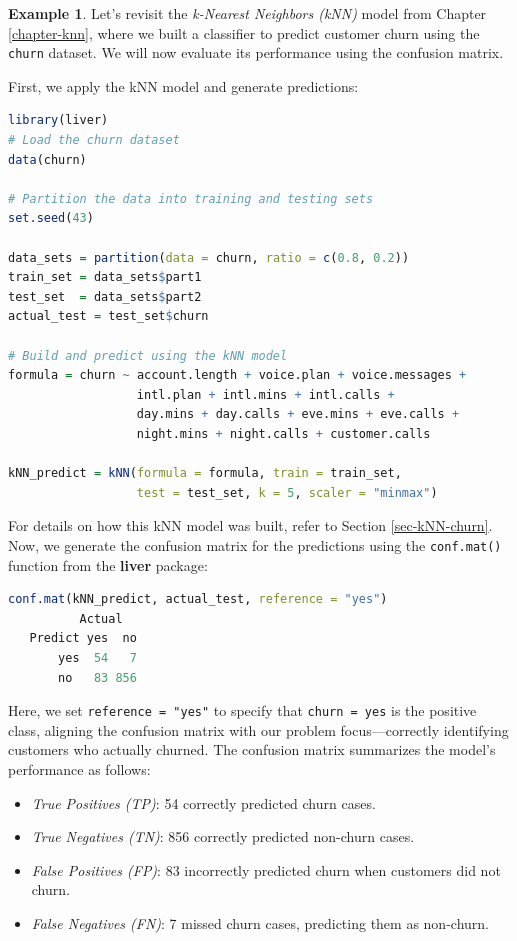 \documentclass[
  11pt,
]{book}
\newcommand{\passthrough}[1]{#1}
\providecommand{\tightlist}{%
  \setlength{\itemsep}{0pt}\setlength{\parskip}{0pt}}
\theoremstyle{definition}
\theoremstyle{definition}
\newtheorem{example}{Example}[chapter]
\theoremstyle{definition}
\theoremstyle{definition}
\theoremstyle{remark}
\begin{document}
\begin{example}
\protect\hypertarget{exm:ex-confusion-matrix-kNN}{}\label{exm:ex-confusion-matrix-kNN}Let's revisit the \emph{k-Nearest Neighbors (kNN)} model from Chapter \ref{chapter-knn}, where we built a classifier to predict customer churn using the \passthrough{\lstinline!churn!} dataset. We will now evaluate its performance using the confusion matrix.

First, we apply the kNN model and generate predictions:

\begin{lstlisting}[language=R]
library(liver)  
# Load the churn dataset
data(churn)

# Partition the data into training and testing sets
set.seed(43)

data_sets = partition(data = churn, ratio = c(0.8, 0.2))
train_set = data_sets$part1
test_set  = data_sets$part2
actual_test = test_set$churn

# Build and predict using the kNN model
formula = churn ~ account.length + voice.plan + voice.messages + 
                  intl.plan + intl.mins + intl.calls + 
                  day.mins + day.calls + eve.mins + eve.calls + 
                  night.mins + night.calls + customer.calls

kNN_predict = kNN(formula = formula, train = train_set, 
                  test = test_set, k = 5, scaler = "minmax")
\end{lstlisting}

For details on how this kNN model was built, refer to Section \ref{sec-kNN-churn}. Now, we generate the confusion matrix for the predictions using the \passthrough{\lstinline!conf.mat()!} function from the \textbf{liver} package:

\begin{lstlisting}[language=R]
conf.mat(kNN_predict, actual_test, reference = "yes")
          Actual
   Predict yes  no
       yes  54   7
       no   83 856
\end{lstlisting}

Here, we set \passthrough{\lstinline!reference = "yes"!} to specify that \passthrough{\lstinline!churn = yes!} is the positive class, aligning the confusion matrix with our problem focus---correctly identifying customers who actually churned. The confusion matrix summarizes the model's performance as follows:

\begin{itemize}
\tightlist
\item
  \emph{True Positives (TP)}: 54 correctly predicted churn cases.\\
\item
  \emph{True Negatives (TN)}: 856 correctly predicted non-churn cases.\\
\item
  \emph{False Positives (FP)}: 83 incorrectly predicted churn when customers did not churn.\\
\item
  \emph{False Negatives (FN)}: 7 missed churn cases, predicting them as non-churn.
\end{itemize}


\end{example}
\end{document}
